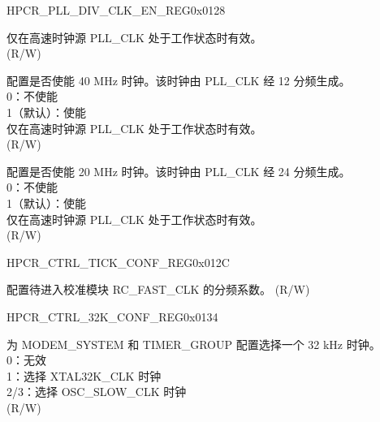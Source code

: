 \begin{register}{H}{PCR\_PLL\_DIV\_CLK\_EN\_REG}{0x0128}
\begin{regdesc}
\begin{reglist}
仅在高速时钟源 PLL\_CLK 处于工作状态时有效。 \\(R/W)
\label{fielddesc:PCRPLL40MCLKEN}\item [PCR\_PLL\_40M\_CLK\_EN] 配置是否使能 40 MHz 时钟。该时钟由 PLL\_CLK 经 12 分频生成。\\
0：不使能\\
1（默认）：使能\\
仅在高速时钟源 PLL\_CLK 处于工作状态时有效。 \\(R/W)
\label{fielddesc:PCRPLL20MCLKEN}\item [PCR\_PLL\_20M\_CLK\_EN] 配置是否使能 20 MHz 时钟。该时钟由 PLL\_CLK 经 24 分频生成。\\
0：不使能\\
1（默认）：使能\\
仅在高速时钟源 PLL\_CLK 处于工作状态时有效。 \\(R/W)
\end{reglist}\end{regdesc}
\end{register}






\begin{register}{H}{PCR\_CTRL\_TICK\_CONF\_REG}{0x012C}\label{regdesc:PCRCTRLTICKCONFREG}
%
%
%
\regnewline%
\begin{regdesc}\begin{reglist}
\label{fielddesc:PCRFOSCTICKNUM}\item [PCR\_FOSC\_TICK\_NUM] 配置待进入校准模块 RC\_FAST\_CLK 的分频系数。 (R/W)
\end{reglist}\end{regdesc}
\end{register}



\begin{register}{H}{PCR\_CTRL\_32K\_CONF\_REG}{0x0134}\label{regdesc:PCRCTRL32KCONFREG}
%
%
\regnewline%
\begin{regdesc}\begin{reglist}
\label{fielddesc:PCR32KSEL}\item [PCR\_32K\_SEL] 为 MODEM\_SYSTEM 和 TIMER\_GROUP 配置选择一个 32 kHz 时钟。\\ 
0：无效\\
1：选择 XTAL32K\_CLK 时钟\\ 
2/3：选择 OSC\_SLOW\_CLK 时钟\\ (R/W)
\end{reglist}\end{regdesc}
\end{register}


